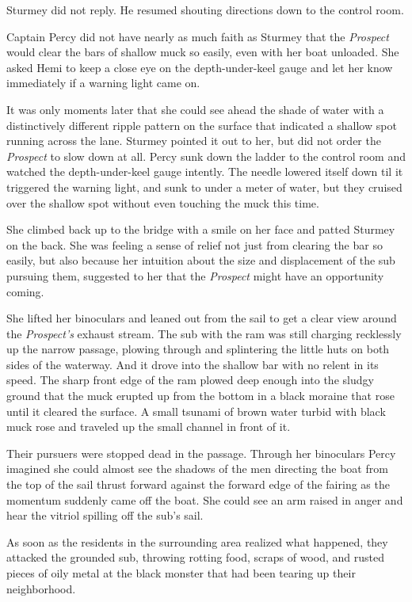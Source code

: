 \documentclass[
]{scrbook}
\begin{document}
Sturmey did not reply. He resumed shouting directions down to the
control room.

Captain Percy did not have nearly as much faith as Sturmey that the
\emph{Prospect} would clear the bars of shallow muck so easily, even
with her boat unloaded. She asked Hemi to keep a close eye on the
depth-under-keel gauge and let her know immediately if a warning light
came on.

It was only moments later that she could see ahead the shade of water
with a distinctively different ripple pattern on the surface that
indicated a shallow spot running across the lane. Sturmey pointed it out
to her, but did not order the \emph{Prospect} to slow down at all. Percy
sunk down the ladder to the control room and watched the
depth-under-keel gauge intently. The needle lowered itself down til it
triggered the warning light, and sunk to under a meter of water, but
they cruised over the shallow spot without even touching the muck this
time.

She climbed back up to the bridge with a smile on her face and patted
Sturmey on the back. She was feeling a sense of relief not just from
clearing the bar so easily, but also because her intuition about the
size and displacement of the sub pursuing them, suggested to her that
the \emph{Prospect} might have an opportunity coming.

She lifted her binoculars and leaned out from the sail to get a clear
view around the \emph{Prospect's} exhaust stream. The sub with the ram
was still charging recklessly up the narrow passage, plowing through and
splintering the little huts on both sides of the waterway. And it drove
into the shallow bar with no relent in its speed. The sharp front edge
of the ram plowed deep enough into the sludgy ground that the muck
erupted up from the bottom in a black moraine that rose until it cleared
the surface. A small tsunami of brown water turbid with black muck rose
and traveled up the small channel in front of it.

Their pursuers were stopped dead in the passage. Through her binoculars
Percy imagined she could almost see the shadows of the men directing the
boat from the top of the sail thrust forward against the forward edge of
the fairing as the momentum suddenly came off the boat. She could see an
arm raised in anger and hear the vitriol spilling off the sub's sail.

As soon as the residents in the surrounding area realized what happened,
they attacked the grounded sub, throwing rotting food, scraps of wood,
and rusted pieces of oily metal at the black monster that had been
tearing up their neighborhood.
\end{document}
